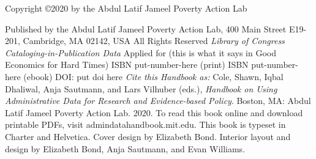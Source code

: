  
\newcommand{\bookcopyrightyear}{2020}
\newcommand{\bookcitation}{Cole, Shawn, Iqbal Dhaliwal, Anja Sautmann, and Lars Vilhuber (eds.), {\itshape Handbook on Using Administrative Data for Research and Evidence-based Policy}. 
Boston, MA: Abdul Latif Jameel Poverty Action Lab. \bookcopyrightyear{}. }
\bigskip
Copyright \copyright \bookcopyrightyear{}  by the Abdul Latif Jameel Poverty Action Lab

Published by the Abdul Latif Jameel Poverty Action Lab, 400 Main Street E19-201, 
Cambridge, MA 02142, USA
\bigskip
\newline
All Rights Reserved
\bigskip
\newline
\textit{Library of Congress Cataloging-in-Publication Data}
\newline
Applied for (this is what it says in Good Economics for Hard Times)
\bigskip
\newline
ISBN put-number-here (print)
\newline ISBN put-number-here (ebook) 
\newline DOI: put doi here 
\bigskip
\newline
\textit{Cite this Handbook as: }
\newline \bookcitation{}
\bigskip
\newline
To read this book online and download printable PDFs, visit \newline admindatahandbook.mit.edu. 
\bigskip
\newline
This book is typeset in Charter and Helvetica. 
\newline Cover design by Elizabeth Bond. Interior layout and design by Elizabeth Bond, Anja Sautmann, and Evan Williams. 






